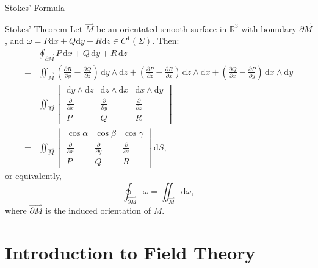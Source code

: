 \documentclass[11pt]{../../TexTemplate/elegantbook}
\begin{document}
\begin{leftbarTitle}{Stokes' Formula}\end{leftbarTitle}
\begin{theorem}{Stokes' Theorem}
    Let \(\overset{\rightharpoonup}{M}\) be an orientated smooth surface in \(\mathbb{R}^{3}\)
    with boundary \(\overset{\rightharpoonup}{\partial M}\),
    and \(\omega = P\mathrm{d}x + Q \mathrm{d}y + R \mathrm{d}z \in C^{1}(\Sigma)\).
    Then:
    \begin{align*}
        &\oint_{\overset{\rightharpoonup}{\partial M}} P \, \mathrm{d}x + Q \, \mathrm{d}y + R \, \mathrm{d}z\\
        =& \iint_{\overset{\rightharpoonup}{M}} \left( 
            \frac{\partial R}{\partial y} - \frac{\partial Q}{\partial z}
        \right) \, \mathrm{d}y \wedge \mathrm{d}z +
        \left( 
            \frac{\partial P}{\partial z} - \frac{\partial R}{\partial x}
        \right) \, \mathrm{d}z \wedge \mathrm{d}x +
        \left(
            \frac{\partial Q}{\partial x} - \frac{\partial P}{\partial y}
        \right) \, \mathrm{d}x \wedge \mathrm{d}y \\
        =& \iint_{\overset{\rightharpoonup}{M}} 
            \begin{vmatrix}\mathrm{d}y \wedge \mathrm{d}z&\mathrm{d}z \wedge \mathrm{d}x& \mathrm{d}x \wedge \mathrm{d}y\\
            \frac{\partial }{\partial x}&\frac{\partial }{\partial y}&\frac{\partial }{\partial z}\\
            P&Q&R            
            \end{vmatrix}\\
        =&\iint_{\overset{\rightharpoonup}{M}} 
        \begin{vmatrix}\cos\alpha&\cos\beta&\cos\gamma \\
        \frac{\partial }{\partial x}&\frac{\partial }{\partial y}&\frac{\partial }{\partial z}\\
        P&Q&R
        \end{vmatrix} \mathrm{d}S,
    \end{align*}
    or equivalently,
    \[
    \oint_{\overset{\rightharpoonup}{\partial M}} \omega = \iint_{\overset{\rightharpoonup}{M}} \mathrm{d}\omega,
    \]
    where \(\overset{\rightharpoonup}{\partial M}\) is the induced orientation of \(\overset{\rightharpoonup}{M}\).
\end{theorem}

\section{Introduction to Field Theory}
\end{document}
